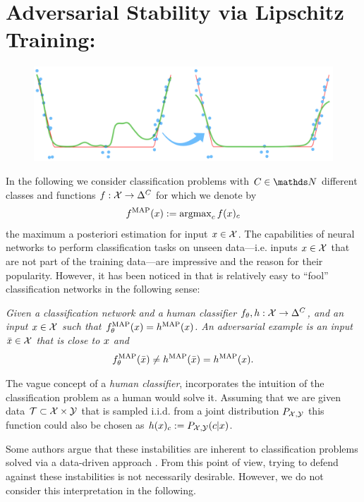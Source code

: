 \section{Adversarial Stability via Lipschitz Training: \cite{bungert2021clip}}\label{sec:CLIP}
%
\begin{figure}
	\centering
	\includegraphics[width=.5\textwidth]{atelier/CLIP/CLIP.png}
\end{figure}
%
%
In the following we consider classification problems with $C\in\N$ different classes and functions $f:\mathcal{X}\to\Delta^C$ for which we denote by 
\begin{align*}
f^{\operatorname{MAP}}(x):=\operatorname{argmax}_c f(x)_c
\end{align*}%
%
the maximum a posteriori estimation for input $x\in\mathcal{X}$. The capabilities of neural networks to perform classification tasks on unseen data---i.e. inputs $x\in\mathcal{X}$ that are not part of the training data---are impressive and the reason for their popularity. However, it has been noticed in \cite{goodfellow2014explaining} that is relatively easy to \enquote{fool} classification networks in the following sense:
%
\begin{center}
\textit{
Given a classification network and a human classifier $f_\theta, h:\mathcal{X}\to\Delta^C$, and an input $x\in\mathcal{X}$ such that $f_\theta^{\operatorname{MAP}}(x) = h^{\operatorname{MAP}}(x)$. An adversarial example is an input $\bar{x}\in \mathcal{X}$ that is close to $x$ and
%
\begin{align*}
f_\theta^{\operatorname{MAP}}(\bar{x})\neq h^{\operatorname{MAP}}(\bar{x}) = h^{\operatorname{MAP}}(x).
\end{align*}
}
\end{center}
%
%
The vague concept of a \emph{human classifier}, incorporates the intuition of the classification problem as a human would solve it. Assuming that we are given data $\mathcal{T}\subset \mathcal{X}\times\mathcal{\mathcal{Y}}$ that is sampled i.i.d. from a joint distribution $P_{\mathcal{X},\mathcal{\mathcal{Y}}}$ this function could also be chosen as $h(x)_c:=P_{\mathcal{X},\mathcal{\mathcal{Y}}}(c|x)$.


\begin{remark}{}{}
Some authors argue that these instabilities are inherent to classification problems solved via a data-driven approach \cite{shafahi2018adversarial, fawzi2018adversarial}. From this point of view, trying to defend against these instabilities is not necessarily desirable. However, we do not consider this interpretation in the following.
\end{remark}
%
%
%

